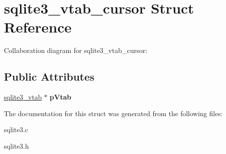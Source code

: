 \hypertarget{structsqlite3__vtab__cursor}{}\section{sqlite3\+\_\+vtab\+\_\+cursor Struct Reference}
\label{structsqlite3__vtab__cursor}


Collaboration diagram for sqlite3\+\_\+vtab\+\_\+cursor\+:
\subsection*{Public Attributes}
\begin{DoxyCompactItemize}
\item 
\hyperlink{structsqlite3__vtab}{sqlite3\+\_\+vtab} $\ast$ {\bfseries p\+Vtab}\hypertarget{structsqlite3__vtab__cursor_a7bb57f3f9c7c618a9d6d33c6d9820bdc}{}\label{structsqlite3__vtab__cursor_a7bb57f3f9c7c618a9d6d33c6d9820bdc}

\end{DoxyCompactItemize}


The documentation for this struct was generated from the following files\+:\begin{DoxyCompactItemize}
\item 
sqlite3.\+c\item 
sqlite3.\+h\end{DoxyCompactItemize}
